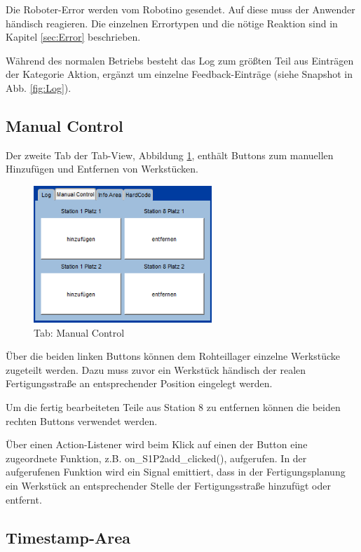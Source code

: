 Die Roboter-Error werden vom Robotino gesendet. Auf diese muss der Anwender händisch reagieren. Die einzelnen Errortypen und die nötige Reaktion sind in Kapitel \ref{sec:Error} beschrieben. 

Während des normalen Betriebs besteht das Log zum größten Teil aus Einträgen der Kategorie Aktion, ergänzt um einzelne Feedback-Einträge (siehe Snapshot in Abb. \ref{fig:Log}).  

\subsection{Manual Control}

Der zweite Tab der Tab-View, Abbildung \ref{fig:ManualControl}, enthält Buttons zum manuellen Hinzufügen und Entfernen von Werkstücken. 

\begin{figure}[htb]
    \centering
    \includegraphics[width=0.6\textwidth]{Abbildungen/ManualControl.png}
    \caption{Tab: Manual Control}		
    \label{fig:ManualControl}
\end{figure}

Über die beiden linken Buttons können dem Rohteillager einzelne Werkstücke zugeteilt werden. Dazu muss zuvor ein Werkstück händisch der realen Fertigungsstraße an entsprechender Position eingelegt werden. 

Um die fertig bearbeiteten Teile aus Station 8 zu entfernen können die beiden rechten Buttons verwendet werden. 

Über einen Action-Listener wird beim Klick auf einen der Button eine zugeordnete Funktion, z.B. on\_S1P2add\_clicked(), aufgerufen. In der aufgerufenen Funktion wird ein Signal emittiert, dass in der Fertigungsplanung ein Werkstück an entsprechender Stelle der Fertigungsstraße hinzufügt oder entfernt. 

\subsection{Timestamp-Area}

